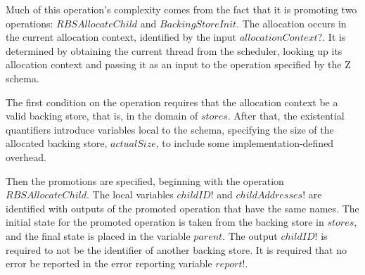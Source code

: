 \documentclass[a4paper,10pt]{report}
\begin{document}
Much of this operation's complexity comes from the fact that it is
promoting two operations: $RBSAllocateChild$ and $BackingStoreInit$. The
allocation occurs in the current allocation context, identified by the input
$allocationContext?$. It is determined by obtaining the current thread from the
scheduler, looking up its allocation context and passing it as an input to the
operation specified by the Z schema.

The first condition on the operation requires that the allocation context be a
valid backing store, that is, in the domain of $stores$. After that, the
existential quantifiers introduce variables local to the schema, specifying the
size of the allocated backing store, $actualSize$, to include some
implementation-defined overhead.

Then the promotions are specified, beginning with the operation
$RBSAllocateChild$. The local variables $childID!$ and $childAddresses!$ are
identified with outputs of the promoted operation that have the same names. The
initial state for the promoted operation is taken from the backing store in
$stores$, and the final state is placed in the variable $parent$.  The output
$childID!$ is required to not be the identifier of another backing store. It is
required that no error be reported in the error reporting variable $report!$.
\end{document}
